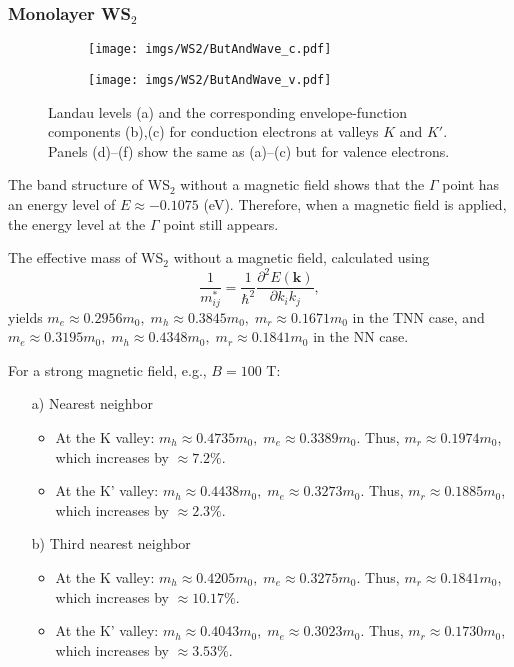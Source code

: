 \documentclass{article}
\begin{document}
\subsubsection*{Monolayer WS$_{2}$}
\begin{figure}[htb]
	\begin{subfigure}{0.495\textwidth}
		\centering
		\texttt{[image: imgs/WS2/ButAndWave\_c.pdf]}
	\end{subfigure}
	\begin{subfigure}{0.495\textwidth}
		\centering
		\texttt{[image: imgs/WS2/ButAndWave\_v.pdf]}
	\end{subfigure}
	\caption{Landau levels (a) and the corresponding envelope-function components (b),(c) for conduction electrons at valleys $K$ and $K'$. Panels (d)–(f) show the same as (a)–(c) but for valence electrons.}
\end{figure}

The band structure of WS$_{2}$ without a magnetic field shows that the $\Gamma$ point has an energy level of $E \approx -0.1075$ (eV). Therefore, when a magnetic field is applied, the energy level at the $\Gamma$ point still appears.  

The effective mass of WS$_{2}$ without a magnetic field, calculated using
\[
\frac{1}{m_{ij}^{*}} = \frac{1}{\hbar^{2}} \frac{\partial^{2} E(\mathbf{k})}{\partial k_{i} k_{j}},
\]
yields $m_{e} \approx 0.2956 m_{0},\; m_{h} \approx 0.3845 m_{0},\; m_{r} \approx 0.1671 m_{0}$ in the TNN case, and $m_{e} \approx 0.3195 m_{0},\; m_{h} \approx 0.4348 m_{0},\; m_{r} \approx 0.1841 m_{0}$ in the NN case.  

For a strong magnetic field, e.g., $B = 100$ T:  
\begin{itemize}
	\item[a)] Nearest neighbor  
	\begin{itemize}
		\item At the K valley: $m_{h} \approx 0.4735 m_{0},\; m_{e} \approx 0.3389 m_{0}$. Thus, $m_{r} \approx 0.1974 m_{0}$, which increases by $\approx 7.2\%$.  
		\item At the K' valley: $m_{h} \approx 0.4438 m_{0},\; m_{e} \approx 0.3273 m_{0}$. Thus, $m_{r} \approx 0.1885 m_{0}$, which increases by $\approx 2.3\%$.  
	\end{itemize}
	\item[b)] Third nearest neighbor  
	\begin{itemize}
		\item At the K valley: $m_{h} \approx 0.4205 m_{0},\; m_{e} \approx 0.3275 m_{0}$. Thus, $m_{r} \approx 0.1841 m_{0}$, which increases by $\approx 10.17\%$.  
		\item At the K' valley: $m_{h} \approx 0.4043 m_{0},\; m_{e} \approx 0.3023 m_{0}$. Thus, $m_{r} \approx 0.1730 m_{0}$, which increases by $\approx 3.53\%$.  
	\end{itemize}
\end{itemize}
\end{document}
